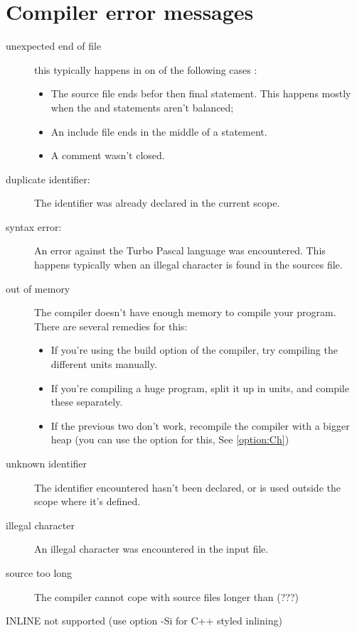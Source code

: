 \documentclass{report}
\newcommand{\seeo}[1]{See \ref{option:#1}}
\begin{document}

\chapter{Compiler error messages}
\begin{description}
\item [unexpected end of file]
this typically happens in on of the following cases :
\begin{itemize}
\item The source file ends befor then final  statement. This
happens mostly when the  and  statements aren't
balanced;
\item An include file ends in the middle of a statement.
\item A comment wasn't closed.
\end{itemize}
\item [duplicate identifier:]
The identifier was already declared in the current scope.
\item [syntax error:]
An error against the Turbo Pascal language was encountered. This happens
typically when an illegal character is found in the sources file.
\item [out of memory]
The compiler doesn't have enough memory to compile your program. There are
several remedies for this:
\begin{itemize}
\item If you're using the build option of the compiler, try compiling the
different units manually.
\item If you're compiling a huge program, split it up in units, and compile
these separately.
\item If the previous two don't work, recompile the compiler with a bigger
heap (you can use the  option for this, \seeo{Ch})
\end{itemize} 
\item [unknown identifier]
The identifier encountered hasn't been declared, or is used outside the
scope where it's defined.
\item [illegal character]
An illegal character was encountered in the input file. 
\item [source too long]
The compiler cannot cope with source files longer than (???)
\item [INLINE not supported (use option -Si for C++ styled inlining)]

\end{description}
\end{document}
